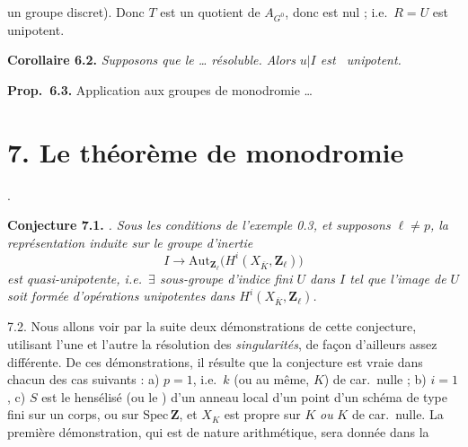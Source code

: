 \documentclass[11pt,a4paper]{article}
\begin{document}
un groupe discret). Donc $T$ est un quotient de $A_{G^{0}}$, donc est nul ; i.e.\ $R = U$ est unipotent.

\textbf{Corollaire 6.2.} \emph{Supposons que le  … résoluble. Alors} \struck{\ill{}} \emph{$u|I$ est \ unipotent.}

\textbf{Prop.\ 6.3.} Application aux groupes de monodromie …


\section{7. Le théorème de monodromie}

 .

\textbf{Conjecture 7.1.} \emph{    . Sous les conditions de l'exemple 0.3, et supposons $\ell \neq p$, la représentation induite sur le groupe d'inertie}
\[ I \longrightarrow \mathrm{Aut}_{\mathbf{Z}_{\ell}}\bigl(H^{i}(X_{\overline{K}}, \mathbf{Z}_{\ell})\bigr) \]
\emph{est quasi-unipotente, i.e.\ $\exists$ sous-groupe d'indice fini $U$ dans $I$ tel que l'image de $U$ soit formée d'opérations unipotentes dans $H^{i}(X_{\overline{K}}, \mathbf{Z}_{\ell})$.}

7.2. Nous allons voir par la suite deux démonstrations  de cette conjecture, utilisant l'une et l'autre \struck{\ill{} \ill{} \ill{}} la résolution des \emph{singularités}, de façon d'ailleurs assez différente. De ces démonstrations, il résulte que la conjecture est vraie dans chacun des cas suivants :
a) $p = 1$, i.e.\ $k$ (ou    au même, $K$) de car.\ nulle ;
b) $i = 1$, 
c) $S$ est le hensélisé (ou le \struck{\ill{}} ) d'un anneau local d'un point d'un schéma de type fini sur un corps, ou sur $\mathrm{Spec}\,\mathbf{Z}$, et $X_{K}$ est propre sur $K$ \emph{ou} $K$ de car.\ nulle.
La première démonstration, qui est de nature arithmétique, sera donnée dans la
\end{document}
